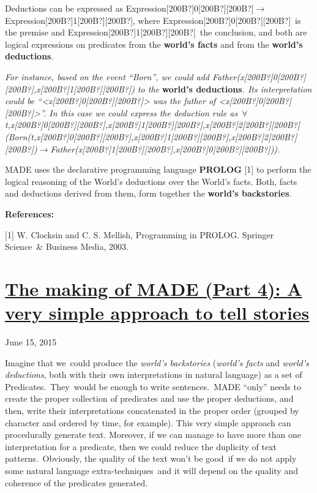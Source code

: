 \documentclass[a4paper]{article}
\newcommand\textstyleStrongEmphasis[1]{\textbf{#1}}
\newcommand\textstyleEmphasis[1]{\textit{#1}}
\begin{document}
Deductions can be expressed as
Expression[200B?]0[200B?][200B?]$\rightarrow
$Expression[200B?]1[200B?][200B?], where
Expression[200B?]0[200B?][200B?]~is the premise and
Expression[200B?]1[200B?][200B?]~the conclusion, and both are logical
expressions on predicates from the
\textstyleStrongEmphasis{world{\textquoteright}s facts} and from the
\textstyleStrongEmphasis{world{\textquoteright}s deductions}.

\textstyleEmphasis{For instance, based on the event
{\textquotedblleft}Born{\textquotedblright}, we could add
Father(x[200B?]0[200B?][200B?],x[200B?]1[200B?][200B?]) to the
}\textstyleStrongEmphasis{world{\textquoteright}s
deductions}\textstyleEmphasis{. Its interpretation could be
{\textquotedblleft}{\textless}x[200B?]0[200B?][200B?]{\textgreater} was
the father of
{\textless}x[200B?]0[200B?][200B?]{\textgreater}{\textquotedblright}.
In this case we could express the deduction rule
as~${\forall}$t,x[200B?]0[200B?][200B?],x[200B?]1[200B?][200B?],x[200B?]2[200B?][200B?](Born(t,x[200B?]0[200B?][200B?],x[200B?]1[200B?][200B?],x[200B?]2[200B?][200B?])$\rightarrow
$Father(x[200B?]1[200B?][200B?],x[200B?]0[200B?][200B?])).}

MADE uses the declarative programming language
\textstyleStrongEmphasis{PROLOG} [1] to perform the logical reasoning
of the World{\textquoteright}s deductions over the
World{\textquoteright}s facts. Both, facts and deductions derived from
them, form together the
\textstyleStrongEmphasis{world{\textquoteright}s backstories}.

{\bfseries
References:}

[1] W. Clocksin and C. S. Mellish, Programming in PROLOG. Springer
Science~\& Business Media, 2003.



\bigskip

\clearpage\section[The making of MADE (Part 4): A very simple approach
to tell
stories]{\href{http://www.velonuboso.com/made/2015/06/15/making-part-4-simple-approach-stories/}{The
making of MADE (Part 4): A very simple approach to tell stories}}
June 15, 2015

Imagine that we~could produce the
\textstyleEmphasis{world{\textquoteright}s backstories}
(\textstyleEmphasis{world{\textquoteright}s facts} and
\textstyleEmphasis{world{\textquoteright}s deductions}, both with their
own interpretations in natural language) as a set of
Predicates.~They~would be enough to write sentences.~MADE
{\textquotedblleft}only{\textquotedblright} needs to create the proper
collection of predicates and use the proper deductions, and then, write
their interpretations concatenated in the proper order (grouped by
character and ordered by time, for example). This very simple approach
can procedurally generate text. Moreover, if we can manage to have more
than one interpretation for a predicate, then we could reduce the
duplicity of text patterns.~Obviously, the quality of the text
won{\textquoteright}t be good~if we do not apply some natural language
extra-techniques~and it will depend on the quality and coherence of the
predicates generated.
\end{document}
